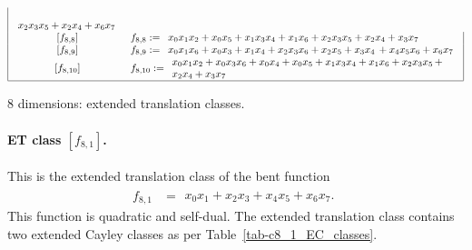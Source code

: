 \documentclass[12pt,a4paper]{article}
\begin{document}
\begin{table}[!bhpt]
\begin{align*}
\begin{array}{|cl|}
\begin{array}{l}
\\
x_{2} x_{3} x_{5} + x_{2} x_{4} + x_{6} x_{7}
\end{array}
\\
\,[f_{ 8 , 8 }] & f_{ 8 , 8 } :=
\begin{array}{l}
x_{0} x_{1} x_{2} + x_{0} x_{5} + x_{1} x_{3} x_{4} + x_{1} x_{6} + x_{2} x_{3} x_{5} + x_{2} x_{4}
+ x_{3} x_{7}
\end{array}
\\
\,[f_{ 8 , 9 }] & f_{ 8 , 9 } :=
\begin{array}{l}
x_{0} x_{1} x_{6} + x_{0} x_{3} + x_{1} x_{4} + x_{2} x_{3} x_{6} + x_{2} x_{5} + x_{3} x_{4}\, +
x_{4} x_{5} x_{6} + x_{6} x_{7}
\end{array}
\\
\,[f_{ 8 , 10 }] & f_{ 8 , 10 } :=
\begin{array}{l}
x_{0} x_{1} x_{2} + x_{0} x_{3} x_{6} + x_{0} x_{4} + x_{0} x_{5} + x_{1} x_{3} x_{4} + x_{1} x_{6}
+ x_{2} x_{3} x_{5}\, +
\\
x_{2} x_{4} + x_{3} x_{7}
\end{array}
\\
\hline
\end{array}
\end{align*}
\normalsize{}
\caption{8 dimensions: extended translation classes.}
\label{tab-c8_ET_classes}
\end{table}
\paragraph*{ET class $[f_{8,1}]$.}
%
This is the extended translation class of the bent function
\small{}
\begin{align*}
f_{ 8 , 1 } &=
\begin{array}{l}
x_{0} x_{1} + x_{2} x_{3} + x_{4} x_{5} + x_{6} x_{7}.
\end{array}
\end{align*}
\normalsize{}
This function is quadratic and self-dual.
The extended translation class contains two extended Cayley classes as per Table~\ref{tab-c8_1_EC_classes}.
\end{document}
